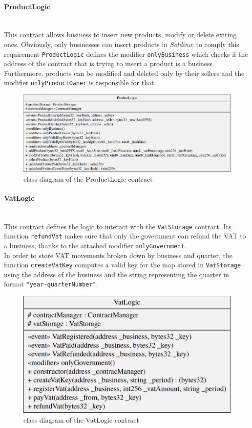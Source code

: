 \paragraph{ProductLogic}\mbox{}\\
\noindent This contract allows business to insert new products, modify or delete exiting ones. Obviously, only businesses can insert products in \textit{Soldino}: to comply this requirement \texttt{ProductLogic} defines the modifier \texttt{onlyBusiness} which checks if the address of the contract that is trying to insert a product is a business. Furthermore, products can be modified and deleted only by their sellers and the modifier \texttt{onlyProductOwner} is responsible for that.
\begin{figure}[H]
	\centering
	\includegraphics[scale=0.25]{res/images/solidity/productlogic.png}
	\caption{class diagram of the ProductLogic contract}
\end{figure}

\paragraph{VatLogic}\mbox{}\\

\noindent This contract defines the logic to interact with the \texttt{VatStorage} contract. 
Its function \texttt{refundVat} makes sure that only the government can refund the VAT to a business, thanks to the attached modifier \texttt{onlyGovernment}.\\
In order to store VAT movements broken down by business and quarter, the function \texttt{createVatKey} computes a valid key for the map stored in \texttt{VatStorage} using the address of the business and the string representing the quarter in format \texttt{"year-quarterNumber"}. 
\begin{figure}[H]
	\centering
	\includegraphics[scale=0.20]{res/images/solidity/vatlogic.png}
	\caption{class diagram of the VatLogic contract}
\end{figure}
\pagebreak
